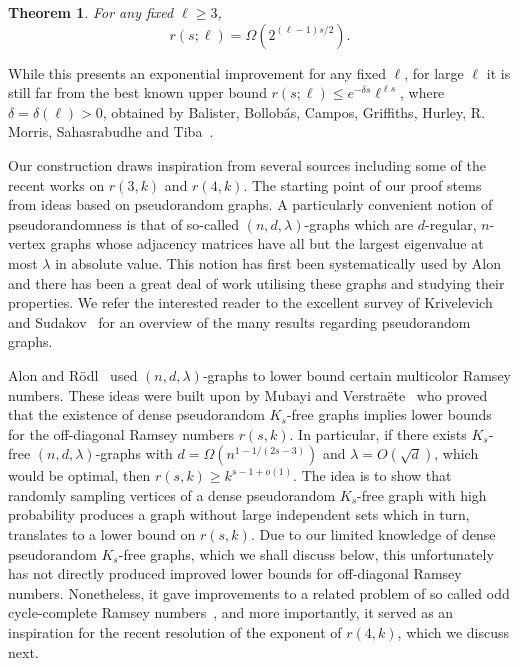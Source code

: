 \documentclass{article}
\theoremstyle{plain}
\newtheorem{theorem}{Theorem}[section]
\theoremstyle{definition}
\begin{document}
\begin{theorem} \label{thm:multicolor}
    For any fixed $\ell \ge 3$,
    \[ r(s; \ell) = \Omega(2^{(\ell-1) s / 2}). \]
\end{theorem}
While this presents an exponential improvement for any fixed $\ell$, for large $\ell$ it is still far from the best known upper bound $r(s; \ell) \le e^{-\delta s} \ell^{\ell s}$, where $\delta = \delta(\ell) > 0$, obtained by Balister, Bollob\'{a}s, Campos, Griffiths, Hurley, R. Morris, Sahasrabudhe and Tiba~\cite{balister}.

Our construction draws inspiration from several sources including some of the recent works on $r(3, k)$ and $r(4, k)$. The starting point of our proof stems from ideas based on pseudorandom graphs. A particularly convenient notion of pseudorandomness is that of so-called $(n, d, \lambda)$-graphs which are $d$-regular, $n$-vertex graphs whose adjacency matrices have all but the largest eigenvalue at most $\lambda$ in absolute value. This notion has first been systematically used by Alon and there has been a great deal of work utilising these graphs and studying their properties. We refer the interested reader to the excellent survey of Krivelevich and Sudakov~\cite{pseudorandomgraphssurvey} for an overview of the many results regarding pseudorandom graphs.

Alon and R\"{o}dl~\cite{alon-rodl} used $(n,d,\lambda)$-graphs to lower bound certain multicolor Ramsey numbers. These ideas were built upon by Mubayi and Verstra\"{e}te~\cite{mubayi-verstraete} who proved that the existence of dense pseudorandom $K_s$-free graphs implies lower bounds for the off-diagonal Ramsey numbers $r(s, k)$. In particular, if there exists $K_s$-free $(n, d, \lambda)$-graphs with $d = \Omega(n^{1 - 1 / (2s-3)})$ and $\lambda = O(\sqrt{d})$, which would be optimal, then $r(s, k) \ge k^{s-1 + o(1)}$. The idea is to show that randomly sampling vertices of a dense pseudorandom $K_s$-free graph with high probability produces a graph without large independent sets which in turn, translates to a lower bound on $r(s, k)$. Due to our limited knowledge of dense pseudorandom $K_s$-free graphs, which we shall discuss below, this unfortunately has not directly produced improved lower bounds for off-diagonal Ramsey numbers. Nonetheless, it gave improvements to a related problem of so called odd cycle-complete Ramsey numbers~\cite{mubayi-verstraete, CMMV-zarankiewicz}, and more importantly, it served as an inspiration for the recent resolution of the exponent of $r(4, k)$, which we discuss next.
\end{document}
